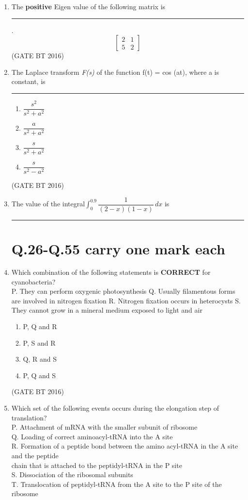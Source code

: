 \documentclass[journal,12pt,onecolumn]{IEEEtran}
\theoremstyle{remark}
\begin{document}
\begin{enumerate}
\item  The \textbf{positive} Eigen value of the following matrix is \rule{2cm }{0.4pt}.\\
\[
\begin{bmatrix}
  2 & 1\\5 & 2
\end{bmatrix}\] 
\hfill(GATE BT 2016) 

\item The Laplace transform \textit{F(s)} of the function f(t) = cos (at), where a is constant, is \rule{2cm }{0.4pt} 	
\begin{multicols}{4}
\begin{enumerate}
\item $\dfrac{s^{2}}{s^{2}+a^{2}}$
\item $\dfrac{a}{s^{2}+a^{2}}$
\item $\dfrac{s}{s^{2}+a^{2}}$
\item $\dfrac{s}{s^{2}-a^{2}}$
\end{enumerate}
\end{multicols} \hfill(GATE BT 2016)  

\item The value of the integral$\int_{0}^{0.9}{\dfrac{1}{(2-x)(1-x)}}\,dx$ is \rule{2cm }{0.4pt}

\section{Q.26-Q.55 carry one mark each}

\item Which combination of the following statements is \textbf{ CORRECT} for cyanobacteria?\\
P. They can perform oxygenic photosynthesis
Q. Usually filamentous forms are involved in nitrogen fixation
R. Nitrogen fixation occurs in heterocysts
S. They cannot grow in a mineral medium exposed to light and air
\begin{multicols}{4}
\begin{enumerate}
\item  P, Q and R
\item  P, S and R
\item  Q, R and S
\item P, Q and S
\end{enumerate}
\end{multicols} \hfill(GATE BT 2016)  

\item Which set of the following events occurs during the elongation step of translation?\\
P. Attachment of mRNA with the smaller subunit of ribosome\\
Q. Loading of correct aminoacyl-tRNA into the A site\\
R. Formation of a peptide bond between the amino acyl-tRNA in the A site and the peptide\\
chain that is attached to the peptidyl-tRNA in the P site\\
S. Dissociation of the ribosomal subunits\\
T. Translocation of peptidyl-tRNA from the A site to the P site of the ribosome


\end{enumerate}
\end{document}
